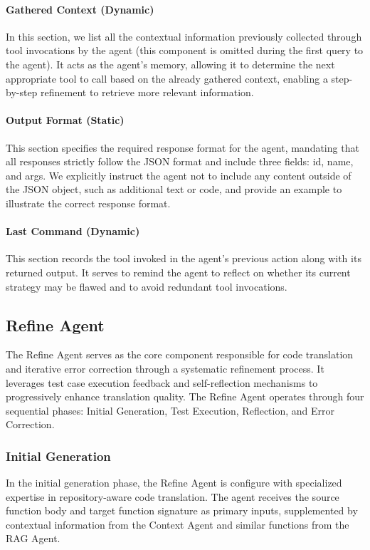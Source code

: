 \paragraph{Gathered Context (Dynamic)} In this section, we list all the contextual information previously collected through tool invocations by the agent (this component is omitted during the first query to the agent). It acts as the agent's memory, allowing it to determine the next appropriate tool to call based on the already gathered context, enabling a step-by-step refinement to retrieve more relevant information.

\paragraph{Output Format (Static)} This section specifies the required response format for the agent, mandating that all responses strictly follow the JSON format and include three fields: id, name, and args. We explicitly instruct the agent not to include any content outside of the JSON object, such as additional text or code, and provide an example to illustrate the correct response format.

\paragraph{Last Command (Dynamic)} This section records the tool invoked in the agent's previous action along with its returned output. It serves to remind the agent to reflect on whether its current strategy may be flawed and to avoid redundant tool invocations.

\subsection{Refine Agent}
The Refine Agent serves as the core component responsible for code translation and iterative error correction through a systematic refinement process. It leverages test case execution feedback and self-reflection mechanisms to progressively enhance translation quality. The Refine Agent operates through four sequential phases: Initial Generation, Test Execution, Reflection, and Error Correction.

\subsubsection{Initial Generation}
In the initial generation phase, the Refine Agent is configure with specialized expertise in repository-aware code translation. The agent receives the source function body and target function signature as primary inputs, supplemented by contextual information from the Context Agent and similar functions from the RAG Agent.


